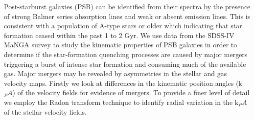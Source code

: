 
Post-starburst galaxies (PSB) can be identified from their spectra by the presence of strong Balmer series absorption lines and weak or absent emission lines. This is consistent with a population of A-type stars or older which indicating that star formation ceased within the past 1 to 2 Gyr. We use data from the SDSS-IV MaNGA survey to study the kinematic properties of PSB galaxies in order to determine if the star-formation quenching processes are caused by major mergers triggering a burst of intense star formation and consuming much of the available gas. Major mergers may be revealed by asymmetries in the stellar and gas velocity maps. Firstly we look at differences in the kinematic position angles (k$_PA$) of the velocity fields for evidence of mergers. To provide a finer level of detail we employ the Radon transform technique to identify radial variation in the k$_PA$ of the stellar velocity fields.


